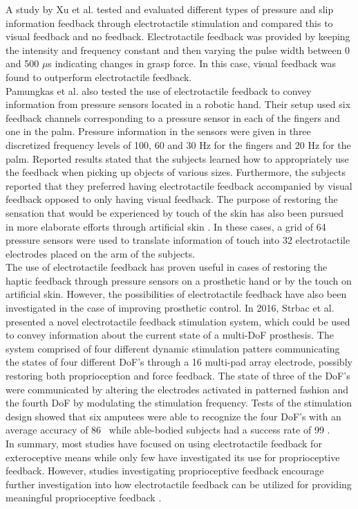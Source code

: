 A study by Xu et al. \cite{Xu2016} tested and evaluated different types of pressure and slip information feedback through electrotactile stimulation and compared this to visual feedback and no feedback. Electrotactile feedback was provided by keeping the intensity and frequency constant and then varying the pulse width between 0 and 500 $\mu $s indicating changes in grasp force. In this case, visual feedback was found to outperform electrotactile feedback. \cite{Xu2016} \\
Pamungkas et al. \cite{Pamungkas2015} also tested the use of electrotactile feedback to convey information from pressure sensors located in a robotic hand. Their setup used six feedback channels corresponding to a pressure sensor in each of the fingers and one in the palm. Pressure information in the sensors were given in three discretized frequency levels of 100, 60 and 30 Hz for the fingers and 20 Hz for the palm. Reported results stated that the subjects learned how to appropriately use the feedback when picking up objects of various sizes. Furthermore, the subjects reported that they preferred having electrotactile feedback accompanied by visual feedback opposed to only having visual feedback. \cite{Pamungkas2015} 
The purpose of restoring the sensation that would be experienced by touch of the skin has also been pursued in more elaborate efforts through artificial skin \cite{Hartmann2014,Franceschi2015}. In these cases, a grid of 64 pressure sensors were used to translate information of touch into 32 electrotactile electrodes placed on the arm of the subjects. \\
The use of electrotactile feedback has proven useful in cases of restoring the haptic feedback through pressure sensors on a prosthetic hand or by the touch on artificial skin. However, the possibilities of electrotactile feedback have also been investigated in the case of improving prosthetic control. In 2016, Strbac et al. \cite{Strbac2016} presented a novel electrotactile feedback stimulation system, which could be used to convey information about the current state of a multi-DoF prosthesis. The system comprised of four different dynamic stimulation patters communicating the states of four different DoF's through a 16 multi-pad array electrode, possibly restoring both proprioception and force feedback. The state of three of the DoF's were communicated by altering the electrodes activated in patterned fashion and the fourth DoF by modulating the stimulation frequency. Tests of the stimulation design showed that six amputees were able to recognize the four DoF's with an average accuracy of 86 \percent~while able-bodied subjects had a success rate of 99 \percent. \cite{Strbac2016}   \\
In summary, most studies have focused on using electrotactile feedback for exteroceptive means while only few have investigated its use for proprioceptive feedback. However, studies investigating proprioceptive feedback encourage further investigation into how electrotactile feedback can be utilized for providing meaningful proprioceptive feedback \cite{Strbac2016}.    

